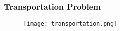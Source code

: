 \documentclass[11pt]{beamer}
\begin{document}
\begin{frame}
\frametitle{Transportation Problem}
\begin{figure}
\centering
\texttt{[image: transportation.png]}
\end{figure}
\end{frame}
%
% 
% 
%
% 
% 
%     
%          
%
% 
% 
% 
%
%    
%    
%    
%    
\end{document}
